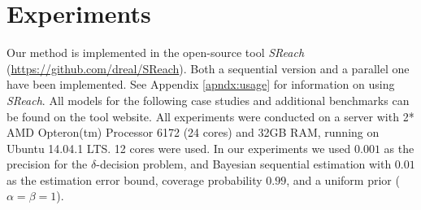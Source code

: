 \section{Experiments}
Our method is implemented in the open-source tool {\it SReach} (\url{https://github.com/dreal/SReach}). Both a sequential version and a parallel one have been implemented. See Appendix \ref{apndx:usage} for information on using {\it SReach}. All models for the following case studies and additional benchmarks can be found on the tool website. All experiments were conducted on a server with 2* AMD Opteron(tm) Processor 6172 (24 cores) and 32GB RAM, running on Ubuntu 14.04.1 LTS. 12 cores were used. In our experiments we used $0.001$ as the precision for the $\delta$-decision problem, and Bayesian sequential estimation with $0.01$ as the estimation error bound, coverage probability $0.99$, and a uniform prior ($\alpha = \beta = 1$).

